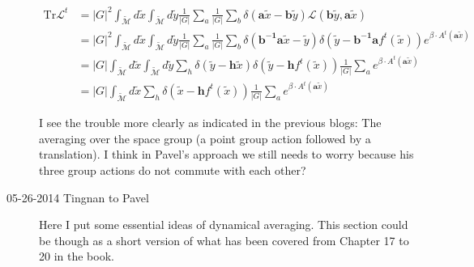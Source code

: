 \begin{description}
\begin{align*}
\mathrm{Tr}\mathcal{L}^{t} & =\vert G\vert^{2}\int_{\tilde{\mathcal{M}}}d\tilde{x}\int_{\tilde{\mathcal{M}}}d\tilde{y}\frac{1}{\vert G\vert}\sum_{a}\frac{1}{\vert G\vert}\sum_{b}\delta(\mathbf{a}\tilde{x}-\mathbf{b}\tilde{y})\mathcal{L}(\mathbf{b}\tilde{y},\mathbf{a}\tilde{x})\\
 & =\vert G\vert^{2}\int_{\tilde{\mathcal{M}}}d\tilde{x}\int_{\tilde{\mathcal{M}}}d\tilde{y}\frac{1}{\vert G\vert}\sum_{a}\frac{1}{\vert G\vert}\sum_{b}\delta(\mathbf{b^{-1}a}\tilde{x}-\tilde{y})\delta(\tilde{y}-\mathbf{b^{-1}a}f^{t}(\tilde{x}))e^{\beta\cdot A^{t}(\mathbf{a}\tilde{x})}\\
 & =\vert G\vert\int_{\tilde{\mathcal{M}}}d\tilde{x}\int_{\tilde{\mathcal{M}}}d\tilde{y}\sum_{h}\delta(\tilde{y}-\mathbf{h}\tilde{x})\delta(\tilde{y}-\mathbf{h}f^{t}(\tilde{x}))\frac{1}{\vert G\vert}\sum_{a}e^{\beta\cdot A^{t}(\mathbf{a}\tilde{x})}\\
 & =\vert G\vert\int_{\tilde{\mathcal{M}}}d\tilde{x}\sum_{h}\delta(\tilde{x}-\mathbf{h}f^{t}(\tilde{x}))\frac{1}{\vert G\vert}\sum_{a}e^{\beta\cdot A^{t}(\mathbf{a}\tilde{x})}
\end{align*}

I see the trouble more clearly as indicated in the previous blogs: The
averaging over the space group (a point group action followed by a
translation). I think in Pavel's approach we still needs to worry
because his three group actions do not commute with each other?

\item[05-26-2014 Tingnan to Pavel]

Here I put some essential ideas of dynamical averaging. This section could be though as a short version of what has been covered from Chapter 17 to 20 in the book.


\end{description}
